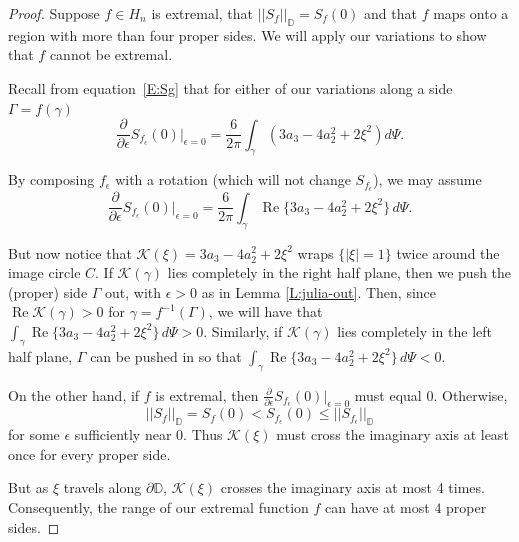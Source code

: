 \documentclass{lms}
\newcommand{\D}{\mathbb D}
\newcommand{\K}{\mathcal K}
\newcommand{\abs}[1]{\lvert#1\rvert}
\newcommand{\norm}[1]{\lvert\lvert#1\rvert\rvert}
\newcommand{\e}{\epsilon}
\newcommand{\iG}{\int_{\gamma}}
\DeclareMathOperator{\re}{Re}
\numberwithin{equation}{section}
\begin{document}
\begin{proof}
Suppose $f\in H_n$ is extremal, that $\norm{S_f}_\D = S_f(0)$
 and that $f$ maps onto a region with more than
four proper sides.  
We will apply our variations to show that $f$
cannot be extremal.  






Recall from equation~\eqref{E:Sg} that for either of our variations along a side
$\Gamma=f(\gamma)$
\[
\frac{\partial}{\partial \epsilon} S_{f_\epsilon} (0) \bigg|_{\epsilon=0}
  = \frac6{2\pi} \iG \left(3a_3 - 4a_2^2 + 2\xi^2\right) d\Psi.
\]


By composing $f_\epsilon$ with a rotation (which will not change $S_{f_\epsilon}$),
 we may assume
\[
\frac{\partial}{\partial \epsilon} S_{f_\epsilon} (0) \bigg|_{\epsilon=0}
=\frac{6}{2\pi} \iG \re \{3a_3 - 4a_2^2 + 2\xi^2\} \,d\Psi.
\]


But now notice that $\K (\xi) = 3a_3 - 4a_2^2 + 2\xi^2$ wraps
$\{\abs{\xi}=1\}$
 twice around the image circle $C$.  If $\K(\gamma)$ lies
completely in the right half plane, then 
we push the (proper)
side $\Gamma$ out, with $\e > 0$ as in Lemma \ref{L:julia-out}.  Then,
since $\re \K(\gamma) > 0$ for $\gamma = f^{-1}(\Gamma)$, we will have
that $\iG \re\{3a_3 - 4a_2^2 +
2\xi^2\} \, d\Psi > 0 $.  Similarly, if $\K (\gamma)$ lies completely in the
left half plane, $\Gamma$ can be pushed in so that
$\iG \re\{3a_3 - 4a_2^2 + 2\xi^2 \} \, d\Psi < 0$.  

On the other hand, 
if $f$ is extremal, then $\frac{\partial }{\partial \epsilon} S_{f_\epsilon}(0)
|_{\epsilon=0}$ must equal $0$. Otherwise, 
\[
\norm{S_f}_\D=S_f(0)<S_{f_\epsilon}(0)\leq\norm{S_{f_\epsilon}}_\D
\]
for some $\epsilon$ sufficiently near $0$.
Thus
$\K(\xi)$ must cross the imaginary axis at least once for every proper side.

But as $\xi$ travels along $\partial \D$, $\K(\xi)$ crosses the imaginary
axis at most 4 times.  Consequently, the range of our extremal function
$f$ can have at most $4$ proper sides.
\end{proof}
\end{document}
